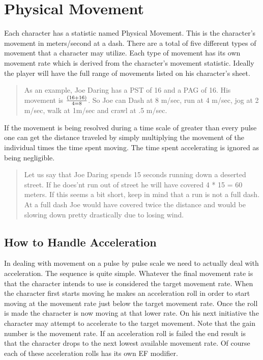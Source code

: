 


\section{Physical Movement}

Each character has a statistic named Physical Movement. This is the character's
movement in meters/second at a dash. There are a total of five different types
of movement that a character may utilize. Each type of movement has its own
movement rate which is derived from the character's movement statistic. 
Ideally the player will have the full range of movements listed on his 
character's sheet. 



\begin{quotation}
As an example, Joe Daring has a PST of 16 and a PAG of 16. His movement is
\( (16 + 16) \over 4  =  8\). So Joe can Dash at 8 m/sec, run at 4 m/sec, jog
at 2 m/sec, walk at 1m/sec and crawl at .5 m/sec.
\end{quotation}

If the movement is being resolved during a time scale of greater than every
pulse one can get the distance traveled by simply multiplying the movement 
of the individual times the time spent moving. The time spent accelerating
is ignored as being negligible.

\begin{quotation}
Let us say that Joe Daring spends 15 seconds running down a deserted street.
If he does'nt run out of street he will have covered 4 * 15 = 60 meters. If 
this seems a bit short, keep in mind that a run is not a full dash. At a full
dash Joe would have covered twice the distance and would be slowing down pretty 
drastically due to losing wind.
\end{quotation}

\subsection{How to Handle Acceleration}

In dealing with movement on a pulse by pulse scale we need to actually deal
with acceleration. The sequence is quite simple. Whatever the final movement 
rate is that the character intends to use is considered the target movement rate.
When the character first starts moving he makes an acceleration roll in 
order to start moving at the movement rate just below the target movement rate.
Once the roll is made the character is now moving at that lower rate. On his next 
initiative the character may attempt to accelerate to the target movement. Note 
that the gain number is the movement rate. If an acceleration roll is failed
the end result is that the character drops to the next lowest available movement 
rate. Of course each of these acceleration rolls has its own EF modifier.  

